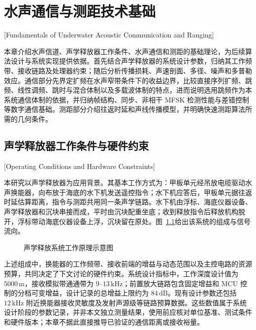 
\chapter{水声通信与测距技术基础}[Fundamentals of Underwater Acoustic Communication and Ranging]
\label{chap02}

本章介绍水声信道、声学释放器工作条件、水声通信和测距的基础理论，为后续算法设计与系统实现提供依据。首先结合声学释放器的系统设计参数，归纳其工作频带、接收链路及处理器约束；随后分析传播损耗、声速剖面、多径、噪声和多普勒效应。通信部分先界定扩频在水声窄带条件下的收益边界，比较直接序列扩频、跳频、线性调频、跳时与混合体制以及多载波体制的特点，进而说明选用跳频作为本系统通信体制的依据，并归纳帧结构、同步、非相干 MFSK 检测性能与差错控制等数字通信基础。测距部分介绍往返时延和声线传播模型，并明确快速测距算法所需的几何条件。

\section{声学释放器工作条件与硬件约束}[Operating Conditions and Hardware Constraints]
\label{sec:chap02_hw}

本研究以声学释放器为应用背景。其基本工作方式为：甲板单元经吊放电缆驱动水声换能器，向布放于海底的水下机发送遥控指令；水下机应答后，甲板单元据往返时延估算距离，指令与测距共用同一条声学链路。水下机由浮标、海底仪器设备、声学释放器和沉块串接而成，平时由沉块配重坐底；收到释放指令后释放机构脱开，浮标带动海底仪器设备上浮，沉块留在原处。图~\ref{fig:chap02_release_schematic}给出该系统的组成与信号流向。

\begin{figure}[htbp]
  \centering
  \begin{tikzpicture}[x=1cm,y=1cm]
   
  \end{tikzpicture}
  \caption[声学释放系统工作原理示意图]{声学释放系统工作原理示意图}
 \label{fig:chap02_release_schematic}
\end{figure}

上述组成中，换能器的工作频带、接收前端的增益与动态范围以及主控电路的资源预算，共同决定了下文讨论的硬件约束。系统设计指标中，工作深度设计值为 $5000\,\mathrm{m}$，接收模拟带通通带为 $9$--$13\,\mathrm{kHz}$；前置放大链路包含固定增益和 MCU 控制的分档可变增益，设计记录的总增益上限约为 $84\,\mathrm{dB}$。现有设计参数还包括 $12\,\mathrm{kHz}$ 附近换能器接收灵敏度及发射声源级等链路预算数据。这些数值属于系统设计阶段的参数记录，并非本文独立测量结果，使用前应核对单位基准、测试条件和硬件版本；本章不据此直接推导已验证的通信距离或接收裕量。

